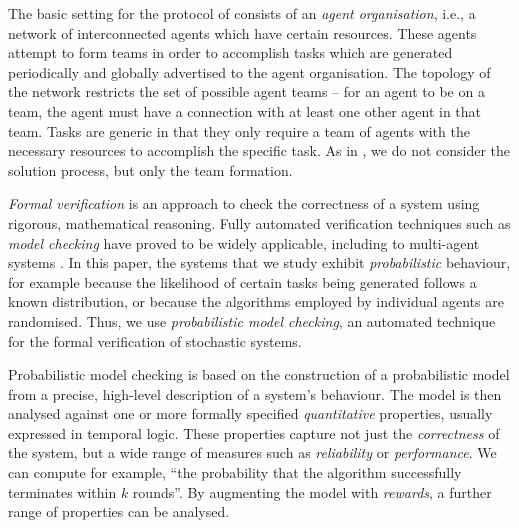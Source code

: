 \documentclass{llncs}
\begin{document}
The basic setting for the protocol of \cite{gaston2005agent} consists of an \emph{agent organisation}, i.e., a network of interconnected agents which have certain resources. These agents attempt to form teams in order to accomplish tasks which are generated periodically and globally advertised to the agent organisation. The topology of the network restricts the set of possible agent teams -- for an agent to be on a team, the agent must have a connection with at least one other agent in that team. Tasks are generic in that they only require a team of agents with the necessary resources to accomplish the specific task. As in \cite{gaston2005agent}, we do not consider the solution process, but only the team formation.

\emph{Formal verification} is an approach to check the correctness of a system
using rigorous, mathematical reasoning.
Fully automated verification techniques such as \emph{model checking}
have proved to be widely applicable,
including to multi-agent systems \cite{lomuscio2006mcmas}.
In this paper, the systems that we study exhibit \emph{probabilistic} behaviour,
for example because the likelihood of certain tasks being generated follows a known distribution,
or because the algorithms employed by individual agents are randomised.
Thus, we use \emph{probabilistic model checking}, an automated technique for
the formal verification of stochastic systems.


Probabilistic model checking is based
on the construction of a probabilistic model from a precise,
high-level description of a system's behaviour.
The model is then analysed against one or more formally specified \emph{quantitative} properties,
usually expressed in temporal logic.
These properties capture not just the \emph{correctness} of the system,
but a wide range of measures such as \emph{reliability} or \emph{performance}.
We can compute for example, ``the probability that the algorithm successfully terminates within $k$ rounds''.
By augmenting the model with \emph{rewards}, a further range of properties can be analysed.
\end{document}
